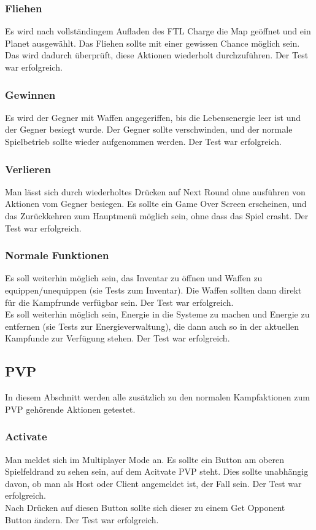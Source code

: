 \documentclass[fontsize=12pt,paper=a4,twoside]{scrartcl}
\begin{document}
\subsubsection{Fliehen}
Es wird nach vollständingem Aufladen des FTL Charge die Map geöffnet und ein Planet ausgewählt. Das Fliehen sollte mit einer gewissen Chance möglich sein. Das wird dadurch überprüft, diese Aktionen wiederholt durchzuführen. Der Test war erfolgreich. \\
\subsubsection{Gewinnen}
Es wird der Gegner mit Waffen angegeriffen, bis die Lebensenergie leer ist und der Gegner besiegt wurde. Der Gegner sollte verschwinden, und der normale Spielbetrieb sollte wieder aufgenommen werden.  Der Test war erfolgreich. \\
\subsubsection{Verlieren}
Man lässt sich durch wiederholtes Drücken auf Next Round ohne ausführen von Aktionen vom Gegner besiegen. Es sollte ein Game Over Screen erscheinen, und das Zurückkehren zum Hauptmenü möglich sein, ohne dass das Spiel crasht.  Der Test war erfolgreich. \\
\subsubsection{Normale Funktionen} 
Es soll weiterhin möglich sein, das Inventar zu öffnen und Waffen zu equippen/unequippen (sie Tests zum Inventar). Die Waffen sollten dann direkt für die Kampfrunde verfügbar sein. Der Test war erfolgreich. \\
Es soll weiterhin möglich sein, Energie in die Systeme zu machen und Energie zu entfernen (sie Tests zur Energieverwaltung), die dann auch so in der aktuellen Kampfunde zur Verfügung stehen. Der Test war erfolgreich. \\

\subsection{PVP}
In diesem Abschnitt werden alle zusätzlich zu den normalen Kampfaktionen zum PVP gehörende Aktionen getestet. \\
\subsubsection{Activate}
Man meldet sich im Multiplayer Mode an. Es sollte ein Button am oberen Spielfeldrand zu sehen sein, auf dem Acitvate PVP steht. Dies sollte unabhängig davon, ob man als Host oder Client angemeldet ist, der Fall sein. Der Test war erfolgreich. \\
Nach Drücken auf diesen Button sollte sich dieser zu einem Get Opponent Button ändern.  Der Test war erfolgreich. \\
\end{document}
